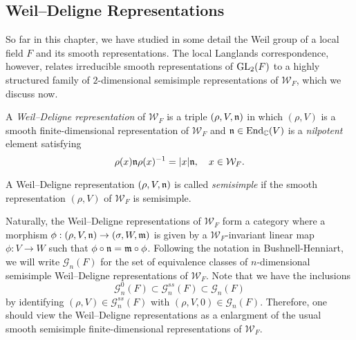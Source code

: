 \subsection{Weil--Deligne Representations}
So far in this chapter, we have studied in some detail the Weil group of a local field $F$ and its smooth representations. The local Langlands correspondence, however, relates irreducible smooth representations of $\mathrm{GL}_2(F)$ to a highly structured family of $2$-dimensional semisimple representations of $\mathcal{W}_F$, which we discuss now.

\begin{defn}\label{defn:WeilDeligne}
    A \textit{Weil--Deligne representation} of $\mathcal{W}_F$ is a triple $(\rho,V,\mathfrak{n})$ in which $(\rho,V)$ is a smooth finite-dimensional representation of $\mathcal{W}_F$ and $\mathfrak{n}\in\mathrm{End}_{\mathbb{C}}(V)$ is a \textit{nilpotent} element satisfying
    $$\rho(x)\mathfrak{n}\rho(x)^{-1}=|x|\mathfrak{n},\quad x\in \mathcal{W}_F.$$

    A Weil--Deligne representation $(\rho,V,\mathfrak{n})$ is called \textit{semisimple} if the smooth representation $(\rho,V)$ of $\mathcal{W}_F$ is semisimple.
\end{defn}

Naturally, the Weil--Deligne representations of $\mathcal{W}_F$ form a category where a morphism $\phi:(\rho,V,\mathfrak{n})\to(\sigma,W,\mathfrak{m})$ is given by a $\mathcal{W}_F$-invariant linear map $\phi:V\to W$ such that $\phi\circ\mathfrak{n}=\mathfrak{m}\circ\phi$. Following the notation in Bushnell-Henniart, we will write $\mathcal{G}_n(F)$ for the set of equivalence classes of $n$-dimensional semisimple Weil--Deligne representations of $\mathcal{W}_F$. Note that we have the inclusions
$$\mathcal{G}^{0}_n(F)\subset\mathcal{G}_n^{ss}(F)\subset\mathcal{G}_n(F)$$
by identifying $(\rho,V)\in\mathcal{G}_n^{ss}(F)$ with $(\rho,V,0)\in\mathcal{G}_n(F)$. Therefore, one should view the Weil--Deligne representations as a enlargment of the usual smooth semisimple finite-dimensional representations of $\mathcal{W}_F$. 

